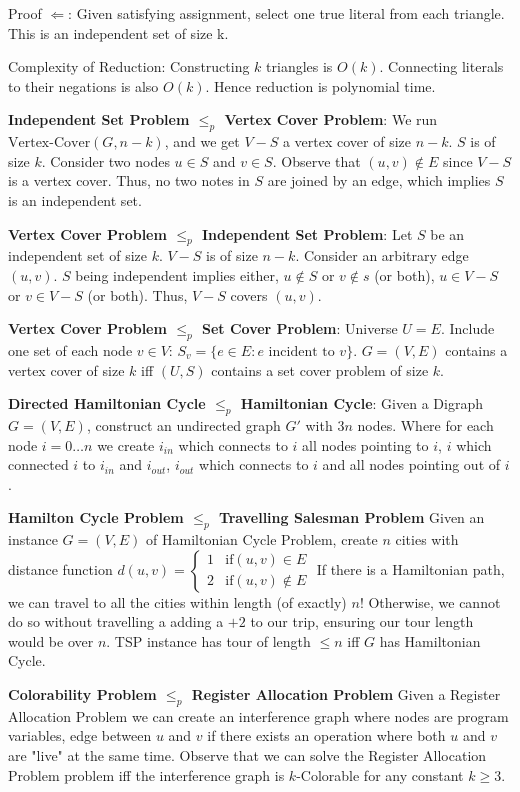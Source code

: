 \documentclass[letterpaper, 8pt]{extarticle}
\begin{document}
\begin{multicols*}{5}
Proof $\Leftarrow$: Given satisfying assignment, select one true literal from each triangle. This is an independent set of size k.

Complexity of Reduction: Constructing $k$ triangles is $O(k)$. Connecting literals to their negations is also $O(k)$. Hence reduction is polynomial time.


\textbf{Independent Set Problem $\le_p$ Vertex Cover Problem}:
We run $\text{Vertex-Cover}(G, n-k)$, and we get $V - S$ a vertex cover of size $n-k$. $S$ is of size $k$. Consider two nodes $u \in S$ and $v \in S$. Observe that $(u, v) \not \in E$ since $V - S$ is a vertex cover. Thus, no two notes in $S$ are joined by an edge, which implies $S$ is an independent set.

\textbf{Vertex Cover Problem $\le_p$ Independent Set Problem}:
Let $S$ be an independent set of size $k$. $V-S$ is of size $n-k$. Consider an arbitrary edge $(u, v)$. $S$ being independent implies either, $u \not \in S$ or $v \not \in s$ (or both), $u \in V - S$ or $v \in V-S$ (or both). Thus, $V-S$ covers $(u, v)$.

\textbf{Vertex Cover Problem $\le_p$ Set Cover Problem}:
Universe $U = E$. Include one set of each node $v \in V$: $S_v = \{ e\in E : e \text{ incident to }v\}$.
$G = (V, E)$ contains a vertex cover of size $k$ iff $(U, S)$ contains a set cover problem of size $k$.

\textbf{Directed Hamiltonian Cycle $\le_p$ Hamiltonian Cycle}:
Given a Digraph $G = (V, E)$, construct an undirected graph $G'$ with $3n$ nodes. Where for each node $i = 0\dots n$ we create $i_{in}$ which connects to $i$ all nodes pointing to $i$, $i$ which connected $i$ to $i_{in}$ and $i_{out}$, $i_{out}$ which connects to $i$ and all nodes pointing out of $i$.

\textbf{Hamilton Cycle Problem $\le_p$ Travelling Salesman Problem}
Given an instance $G = (V, E)$ of Hamiltonian Cycle Problem, create $n$ cities with distance function
$d(u,v) = \begin{cases}
1 & \text{if}(u, v) \in E \\
2 & \text{if}(u, v) \not \in E
\end{cases}$
If there is a Hamiltonian path, we can travel to all the cities within length (of exactly) $n$! Otherwise, we cannot do so without travelling a adding a $+2$ to our trip, ensuring our tour length would be over $n$. TSP instance has tour of length $\le n$ iff $G$ has Hamiltonian Cycle.

\textbf{Colorability Problem $\le_p$ Register Allocation Problem}
Given a Register Allocation Problem we can create an interference graph where nodes are program variables, edge between $u$ and $v$ if there exists an operation where both $u$ and $v$ are "live" at the same time. Observe that we can solve the Register Allocation Problem problem iff the interference graph is $k$-Colorable for any constant $k \ge 3$.


\end{multicols*}
\end{document}
